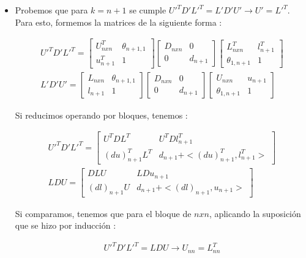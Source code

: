 \documentclass{article}
\begin{document}
\begin{enumerate}
\begin{itemize}
\begin{itemize}
\item Probemos que para $k = n + 1$ se cumple $U'^{T}D'L'^{T} = L'D'U' \rightarrow U' = L'^{T}$. Para esto, formemos la matrices de la siguiente forma :

\begin{gather*}
U'^{T}D'L'^{T} = 
\begin{bmatrix}
	U^{T}_{nxn}  & \theta_{n+1,1} \\
	 u^{T}_{n+1} & 1
\end{bmatrix}
	\begin{bmatrix}
		D_{nxn} & 0 \\
		   0    & d_{n+1}
	\end{bmatrix}
		\begin{bmatrix}
			L^{T}_{nxn}  	   & l^{T}_{n+1} \\
			    \theta_{1,n+1} & 1
		\end{bmatrix}
\\
L'D'U' = 
\begin{bmatrix}
	L_{nxn}  & \theta_{n+1,1} \\
	 l_{n+1} & 1
\end{bmatrix}
	\begin{bmatrix}
		D_{nxn} & 0 \\
		   0    & d_{n+1}
	\end{bmatrix}
		\begin{bmatrix}
			U _{nxn}  	& u_{n+1} \\
		 \theta_{1,n+1} & 1
		\end{bmatrix}
\end{gather*}

Si reducimos operando por bloques, tenemos :

\begin{gather*}
U'^{T}D'L'^{T} =
\begin{bmatrix}
	U^{T}DL^{T}  		 & U^{T}Dl^{T}_{n+1} \\
	 (du)^{T}_{n+1}L^{T} & d_{n+1} + <(du)^{T}_{n+1}, l^{T}_{n+1}>
\end{bmatrix}
\\
LDU =
\begin{bmatrix}
			DLU  		 & LDu_{n+1} \\
	 (dl)_{n+1}U 		 & d_{n+1} + <(dl)_{n+1},u_{n+1}>
\end{bmatrix}
\end{gather*}

Si comparamos, tenemos que para el bloque de $nxn$, aplicando la suposici\'on que se hizo por inducci\'on :

\begin{gather*}
U'^{T}D'L'^{T} = LDU \rightarrow U_{nn} = L^{T}_{nn}
\end{gather*}


\end{itemize}
\end{itemize}
\end{enumerate}
\end{document}
